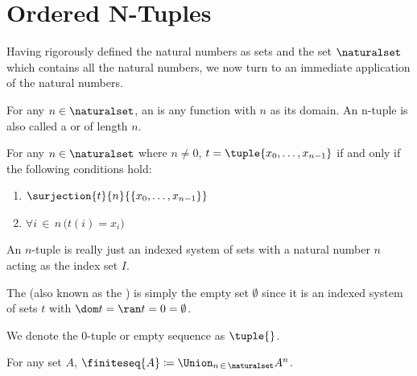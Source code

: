 \section{Ordered N-Tuples}
Having rigorously defined the natural numbers as sets and the set \( \naturalset \) which contains all the natural numbers,
we now turn to an immediate application of the natural numbers.

\begin{dfn}
    \label{dfn:n-tuples}
    For any \( n \in \naturalset \), an  is any function with \( n \) as its domain.
    An n-tuple is also called a  or  of length \( n \).
\end{dfn}

\begin{dfn}
    \label{dfn:n-tuples-sequence-notation}
    For any \( n \in \naturalset \) where \( n \neq 0 \),
    \( t = \tuple{x_{0}, \dots, x_{n-1}} \) if and only if the following conditions hold:
    \begin{enumerate}[topsep=2pt,noitemsep,label=\texttt{\textup{(\alph*)}}]
        \item \( \surjection{t}{n}{\mleft\{ x_{0},\dots,x_{n-1} \mright\}} \)
        \item \( \forall i\,{\in}\,n \, \big( t(i) = x_{i} \big) \)
    \end{enumerate}
\end{dfn}

\begin{rem}
    An \( n \)-tuple is really just an indexed system of sets with a natural number \( n \) acting as
    the index set \( I \).
\end{rem}

\begin{cor}[0-Tuple]
    \label{thm:zero-tuple}
    The  (also known as the ) is simply the empty set \( \emptyset \)
    since it is an indexed system of sets \( t \)
    with \( \dom t = \ran t = 0 = \emptyset \).
\end{cor}

\begin{notation}
    We denote the \( 0 \)-tuple or empty sequence as \( \tuple{} \).
\end{notation}

\begin{dfn}
     \label{dfn:set-of-all-finite-sequences-of-elements-from-a-set}
    For any set \( A \), \( \finiteseq{A} \coloneq \Union_{n \,\in\, \naturalset} A^{n} \).
\end{dfn}

